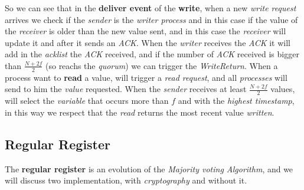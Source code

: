\documentclass{article}
\begin{document}
So we can see that in the \textbf{deliver event} of the \textbf{write}, when a new \emph{write request} arrives we check if the \emph{sender} is the\emph{ writer process} and in this case if the value of the \emph{receiver} is older than the new value sent, and in this case the \emph{receiver} will update it and after it sends an \emph{ACK}. When the \emph{writer} receives the \emph{ACK} it will add in the \emph{acklist} the \emph{ACK} received, and if the number of \emph{ACK} received is bigger than $\frac{N+2f}{2}$ (so reachs the \emph{quorum}) we can trigger the \emph{WriteReturn}. When a process want to \textbf{read} a value, will trigger a \emph{read request}, and all \emph{processes} will send to him the \emph{value} requested. When the \emph{sender} receives at least $\frac{N+2f}{2}$ values, will select the \emph{variable} that occurs more than $f$ and with the \emph{highest timestamp}, in this way we respect that the \emph{read} returns the most recent value \emph{written}. 
\subsection{Regular Register}
The \textbf{regular register} is an evolution of the \emph{Majority voting Algorithm}, and we will discuss two implementation, with \emph{cryptography} and without it. 
\end{document}
